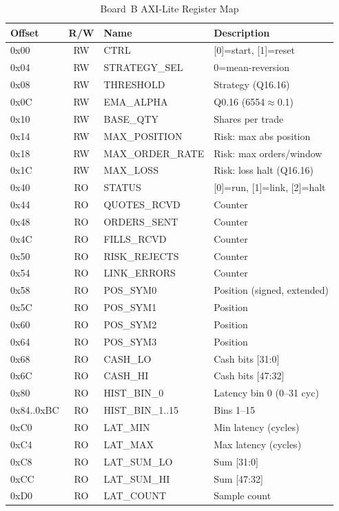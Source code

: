 \documentclass[conference]{IEEEtran}
\begin{document}
\begin{table}[h]
\centering
\caption{Board~B AXI-Lite Register Map}
\label{tab:regb}
\begin{tabular}{@{}lclL{2.8cm}@{}}
\toprule
\textbf{Offset} & \textbf{R/W} & \textbf{Name} & \textbf{Description} \\
\midrule
0x00 & RW & CTRL & [0]=start, [1]=reset \\
0x04 & RW & STRATEGY\_SEL & 0=mean-reversion \\
0x08 & RW & THRESHOLD & Strategy (Q16.16) \\
0x0C & RW & EMA\_ALPHA & Q0.16 (6554$\approx$0.1) \\
0x10 & RW & BASE\_QTY & Shares per trade \\
0x14 & RW & MAX\_POSITION & Risk: max abs position \\
0x18 & RW & MAX\_ORDER\_RATE & Risk: max orders/window \\
0x1C & RW & MAX\_LOSS & Risk: loss halt (Q16.16) \\
0x40 & RO & STATUS & [0]=run, [1]=link, [2]=halt \\
0x44 & RO & QUOTES\_RCVD & Counter \\
0x48 & RO & ORDERS\_SENT & Counter \\
0x4C & RO & FILLS\_RCVD & Counter \\
0x50 & RO & RISK\_REJECTS & Counter \\
0x54 & RO & LINK\_ERRORS & Counter \\
0x58 & RO & POS\_SYM0 & Position (signed, extended) \\
0x5C & RO & POS\_SYM1 & Position \\
0x60 & RO & POS\_SYM2 & Position \\
0x64 & RO & POS\_SYM3 & Position \\
0x68 & RO & CASH\_LO & Cash bits [31:0] \\
0x6C & RO & CASH\_HI & Cash bits [47:32] \\
0x80 & RO & HIST\_BIN\_0 & Latency bin 0 (0--31 cyc) \\
0x84..0xBC & RO & HIST\_BIN\_1..15 & Bins 1--15 \\
0xC0 & RO & LAT\_MIN & Min latency (cycles) \\
0xC4 & RO & LAT\_MAX & Max latency (cycles) \\
0xC8 & RO & LAT\_SUM\_LO & Sum [31:0] \\
0xCC & RO & LAT\_SUM\_HI & Sum [47:32] \\
0xD0 & RO & LAT\_COUNT & Sample count \\
\bottomrule
\end{tabular}
\end{table}
\end{document}
